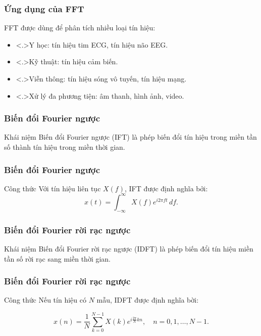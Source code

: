 \begin{frame}
  \frametitle{Ứng dụng của FFT}

  FFT được dùng để phân tích nhiều loại tín hiệu:

  \onslide<+->
  \begin{itemize}[<+->]
    \item \alert<.>{Y học}: tín hiệu tim ECG, tín hiệu não EEG.
    \item \alert<.>{Kỹ thuật}: tín hiệu cảm biến.
    \item \alert<.>{Viễn thông}: tín hiệu sóng vô tuyến, tín hiệu mạng.
    \item \alert<.>{Xử lý đa phương tiện}: âm thanh, hình ảnh, video.
  \end{itemize}
\end{frame}

\begin{frame}
  \frametitle{Biến đổi Fourier ngược}
  \begin{block}{Khái niệm}
    Biến đổi Fourier ngược (IFT) là phép biến đổi tín hiệu trong miền tần số
    thành tín hiệu trong miền thời gian.
  \end{block}
\end{frame}

\begin{frame}
  \frametitle{Biến đổi Fourier ngược}
  \begin{block}{Công thức}
    Với tín hiệu liên tục $X(f)$, IFT được định nghĩa bởi:
    \begin{equation}
      x(t)=\int_{-\infty}^{\infty}X(f)e^{i2\pi ft}\,df.
    \end{equation}
  \end{block}
\end{frame}

\begin{frame}
  \frametitle{Biến đổi Fourier rời rạc ngược}

  \begin{block}{Khái niệm}
    Biến đổi Fourier rời rạc ngược (IDFT) là phép biến đổi tín hiệu miền tần
    số rời rạc sang miền thời gian.
  \end{block}
\end{frame}

\begin{frame}
  \frametitle{Biến đổi Fourier rời rạc ngược}
  \begin{block}{Công thức}
    Nếu tín hiệu có $N$ mẫu, IDFT được định nghĩa bời:

    \begin{equation}
      x(n)=\frac{1}{N}\sum_{k=0}^{N-1}X(k)e^{i\frac{2\pi}{N}kn},
      \quad n=0,1,\ldots,N-1.
    \end{equation}
  \end{block}
\end{frame}

